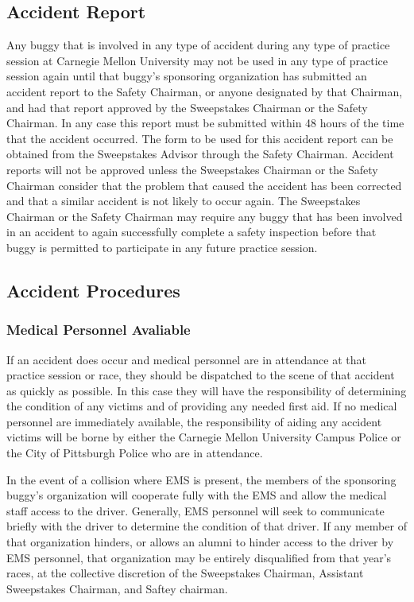 \subsection{Accident Report}

	Any buggy that is involved in any type of accident during any type of practice session at Carnegie Mellon University may not be used in any type of practice session again until that buggy's sponsoring organization has submitted an accident report to the Safety Chairman, or anyone designated by that Chairman, and had that report approved by the Sweepstakes Chairman or the Safety Chairman. In any case this report must be submitted within 48 hours of the time that the accident occurred. The form to be used for this accident report can be obtained from the Sweepstakes Advisor through the Safety Chairman. Accident reports will not be approved unless the Sweepstakes Chairman or the Safety Chairman consider that the problem that caused the accident has been corrected and that a similar accident is not likely to occur again. The Sweepstakes Chairman or the Safety Chairman may require any buggy that has been involved in an accident to again successfully complete a safety inspection before that buggy is permitted to participate in any future practice session.

\subsection{Accident Procedures}

	\subsubsection{Medical Personnel Avaliable}
	If an accident does occur and medical personnel are in attendance at that practice session or race, they should be dispatched to the scene of that accident as quickly as possible. In this case they will have the responsibility of determining the condition of any victims and of providing any needed first aid. If no medical personnel are immediately available, the responsibility of aiding any accident victims will be borne by either the Carnegie Mellon University Campus Police or the City of Pittsburgh Police who are in attendance.

	In the event of a collision where EMS is present, the members of the sponsoring buggy's organization will cooperate fully with the EMS and allow the medical staff access to the driver. Generally, EMS personnel will seek to communicate briefly with the driver to determine the condition of that driver. If any member of that organization hinders, or allows an alumni to hinder access to the driver by EMS personnel, that organization may be entirely disqualified from that year's races, at the collective discretion of the Sweepstakes Chairman, Assistant Sweepstakes Chairman, and Saftey chairman.

